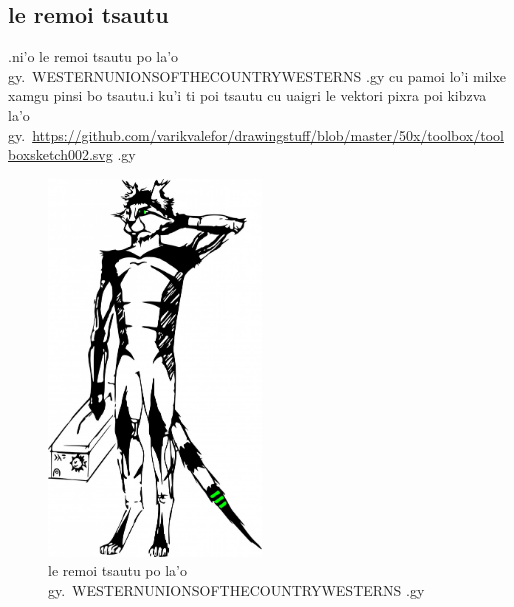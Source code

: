 \documentclass{report}
\newcommand\imageheight{10cm}
\begin{document}
\subsection{le remoi tsautu}
.ni'o le remoi tsautu po la'o gy.\ WESTERNUNIONSOFTHECOUNTRYWESTERNS .gy cu pamoi lo'i milxe xamgu pinsi bo tsautu\@  .i ku'i ti poi tsautu cu uaigri le vektori pixra poi kibzva la'o gy.\ \url{https://github.com/varikvalefor/drawingstuff/blob/master/50x/toolbox/toolboxsketch002.svg} .gy
\begin{figure}[ht]
	\centering
	\includegraphics[height=\imageheight]{50x/toolbox/s1v2.jpg}
	\caption[center]{le remoi tsautu po la'o gy.\ WESTERNUNIONSOFTHECOUNTRYWESTERNS .gy}
\end{figure}
\end{document}
